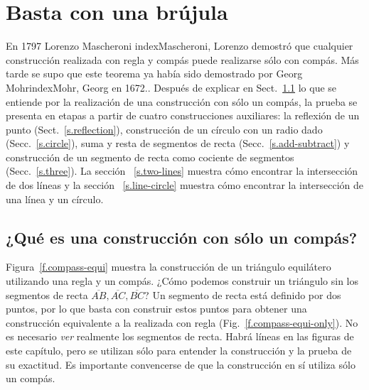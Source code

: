 
\chapter{Basta con una brújula}\label{c.compass}


En 1797 Lorenzo Mascheroni {index{Mascheroni, Lorenzo}} demostró que cualquier construcción realizada con regla y compás puede realizarse sólo con compás. Más tarde se supo que este teorema ya había sido demostrado por Georg Mohrindex{Mohr, Georg} en 1672..
Después de explicar en Sect.~\ref{s.compass-what} lo que se entiende por la realización de una construcción con sólo un compás, la prueba se presenta en etapas a partir de cuatro construcciones auxiliares: la reflexión de un punto (Sect.~\ref{s.reflection}), construcción de un círculo con un radio dado (Secc.~\ref{s.circle}), suma y resta de segmentos de recta (Secc.~\ref{s.add-subtract}) y construcción de un segmento de recta como cociente de segmentos (Secc.~\ref{s.three}). La sección ~\ref{s.two-lines} muestra cómo encontrar la intersección de dos líneas y la sección ~\ref{s.line-circle} muestra cómo encontrar la intersección de una línea y un círculo.

\section{¿Qué es una construcción con sólo un compás?}\label{s.compass-what}

Figura~\ref{f.compass-equi} muestra la construcción de un triángulo equilátero utilizando una regla y un compás. ¿Cómo podemos construir un triángulo sin los segmentos de recta $\overline{AB}, \overline{AC}, \overline{BC}$? Un segmento de recta está definido por dos puntos, por lo que basta con construir estos puntos para obtener una construcción equivalente a la realizada con regla (Fig.~\ref{f.compass-equi-only}). No es necesario \emph{ver} realmente los segmentos de recta.
Habrá líneas en las figuras de este capítulo, pero se utilizan sólo para entender la construcción y la prueba de su exactitud. Es importante convencerse de que la construcción en sí utiliza sólo un compás.

